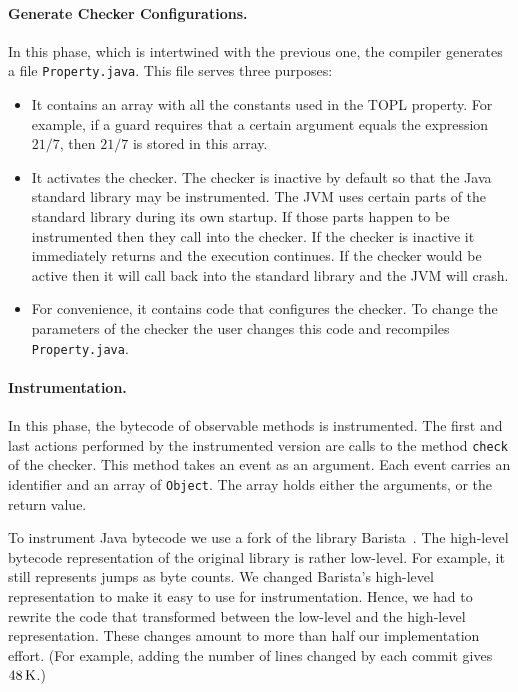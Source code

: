 \documentclass[9pt, preprint]{sigplanconf} %
\theoremstyle{definition}
\theoremstyle{remark}
\begin{document}
\paragraph{Generate Checker Configurations.}

In this phase, which is intertwined with the previous one, the compiler generates a file {\tt Property.java}.
This file serves three purposes:
\begin{itemize}
\item
It contains an array with all the constants used in the TOPL property.
For example, if a guard requires that a certain argument equals the expression~$21/7$, then $21/7$ is stored in this array.
\item
It activates the checker.
The checker is inactive by default so that the Java standard library may be instrumented.
The JVM uses certain parts of the standard library during its own startup.
If those parts happen to be instrumented then they call into the checker.
If the checker is inactive it immediately returns and the execution continues.
If the checker would be active then it will call back into the standard library and the JVM will crash.
\item
For convenience, it contains code that configures the checker.
To change the parameters of the checker the user changes this code and recompiles {\tt Property.java}.
\end{itemize}

\paragraph{Instrumentation.}

In this phase, the bytecode of observable methods is instrumented.
The first and last actions performed by the instrumented version are calls to the method {\tt check} of the checker.
This method takes an event as an argument.
Each event carries an identifier and an array of {\tt Object}.
The array holds either the arguments, or the return value.

To instrument Java bytecode we use a fork of the library Barista~\cite{barista}.
The high-level bytecode representation of the original library is rather low-level.
For example, it still represents jumps as byte counts.
We changed Barista's high-level representation to make it easy to use for instrumentation.
Hence, we had to rewrite the code that transformed between the low-level and the high-level representation.
These changes amount to more than half our implementation effort.
(For example, adding the number of lines changed by each commit gives $48\rm\,K$.)
\end{document}
